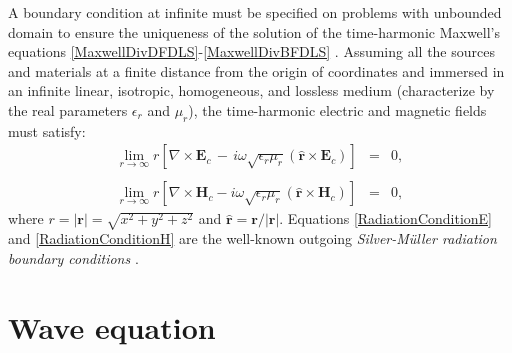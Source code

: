 A boundary condition at infinite must be specified on problems with unbounded domain to ensure the uniqueness of the solution of the time-harmonic Maxwell's equations \eqref{MaxwellDivDFDLS}-\eqref{MaxwellDivBFDLS} \cite{Cessenat}. Assuming all the sources and materials at a finite distance from the origin of coordinates and immersed in an infinite linear, isotropic, homogeneous, and lossless medium (characterize by the real parameters $\epsilon_{r}$ and $\mu_{r}$), the time-harmonic electric and magnetic fields must satisfy:
\begin{eqnarray}
    \lim_{r\rightarrow\infty} r \left[\nabla\times\mathbf{E}_{c}\,-\, i\omega\sqrt{\epsilon_{r}\mu_{r}} \left(\mathbf{\hat{r}}\times\mathbf{E}_{c}\right)\right] &=& 0,
    \label{RadiationConditionE}
	\\\nonumber
	\\[-1em]
	\lim_{r\rightarrow\infty} r \left[\nabla\times\mathbf{H}_{c} - i\omega\sqrt{\epsilon_{r}\mu_{r}} \left(\mathbf{\hat{r}}\times\mathbf{H}_{c}\right)\right] &=& 0,
	\label{RadiationConditionH}
\end{eqnarray}
where $r = |\mathbf{r}| = \sqrt{x^{2} + y^{2} + z^{2}}$ and $\mathbf{\hat{r}} = \mathbf{r}/|\mathbf{r}|$. Equations \eqref{RadiationConditionE} and \eqref{RadiationConditionH} are the well-known outgoing \textit{Silver-M\"{u}ller radiation boundary conditions} \cite{SilverMullerRadiation}.

\section{Wave equation}\label{sWaveEquation}

